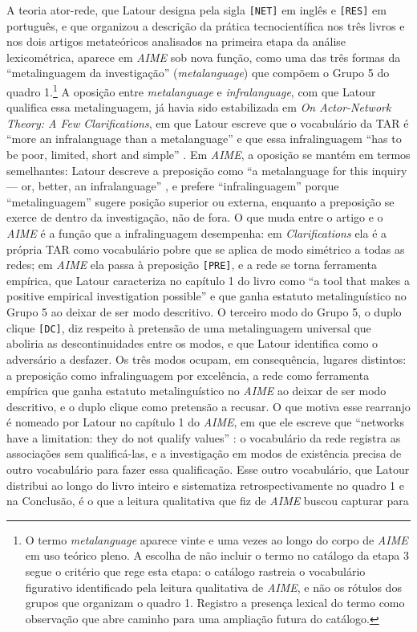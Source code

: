 A teoria ator-rede, que Latour designa pela sigla \texttt{[NET]} em inglês e \texttt{[RES]} em português, e que organizou a descrição da prática tecnocientífica nos três livros e nos dois artigos metateóricos analisados na primeira etapa da análise lexicométrica, aparece em \textit{AIME} sob nova função, como uma das três formas da \enquote{metalinguagem da investigação} (\textit{metalanguage}) que compõem o Grupo 5 do quadro 1.\footnote{O termo \emph{metalanguage} aparece vinte e uma vezes ao longo do corpo de \textit{AIME} em uso teórico pleno. A escolha de não incluir o termo no catálogo da etapa  3 segue o critério que rege esta etapa: o catálogo rastreia o vocabulário figurativo identificado pela leitura qualitativa de \textit{AIME}, e não os rótulos dos grupos que organizam o quadro 1. Registro a presença lexical do termo como observação que abre caminho para uma ampliação futura do catálogo.} A oposição entre \emph{metalanguage} e \emph{infralanguage}, com que Latour qualifica essa metalinguagem, já havia sido estabilizada em \emph{On Actor-Network Theory: A Few Clarifications}, em que Latour escreve que o vocabulário da TAR é \enquote{more an infralanguage than a metalanguage} e que essa infralinguagem \enquote{has to be poor, limited, short and simple} \parencite[p.~\texttt{[p. 7]}]{latour1996clarifications}. Em \textit{AIME}, a oposição se mantém em termos semelhantes: Latour descreve a preposição como \enquote{a metalanguage for this inquiry --- or, better, an infralanguage} \parencite[p.~263]{Latour2013Inquiry}, e prefere \enquote{infralinguagem} porque \enquote{metalinguagem} sugere posição superior ou externa, enquanto a preposição se exerce de dentro da investigação, não de fora. O que muda entre o artigo e o \textit{AIME} é a função que a infralinguagem desempenha: em \emph{Clarifications} ela é a própria TAR como vocabulário pobre que se aplica de modo simétrico a todas as redes; em \textit{AIME} ela passa à preposição \texttt{[PRE]}, e a rede se torna ferramenta empírica, que Latour caracteriza no capítulo 1 do livro como \enquote{a tool that makes a positive empirical investigation possible} \parencite[p.~36]{Latour2013Inquiry} e que ganha estatuto metalinguístico no Grupo 5 ao deixar de ser modo descritivo. O terceiro modo do Grupo 5, o duplo clique \texttt{[DC]}, diz respeito à pretensão de uma metalinguagem universal que aboliria as descontinuidades entre os modos, e que Latour identifica como o adversário a desfazer. Os três modos ocupam, em consequência, lugares distintos: a preposição como infralinguagem por excelência, a rede como ferramenta empírica que ganha estatuto metalinguístico no \textit{AIME} ao deixar de ser modo descritivo, e o duplo clique como pretensão a recusar. O que motiva esse rearranjo é nomeado por Latour no capítulo 1 do \textit{AIME}, em que ele escreve que \enquote{networks have a limitation: they do not qualify values} \parencite[p.~35]{Latour2013Inquiry}: o vocabulário da rede registra as associações sem qualificá-las, e a investigação em modos de existência precisa de outro vocabulário para fazer essa qualificação. Esse outro vocabulário, que Latour distribui ao longo do livro inteiro e sistematiza retrospectivamente no quadro 1 e na Conclusão, é o que a leitura qualitativa que fiz de \textit{AIME} buscou capturar para 